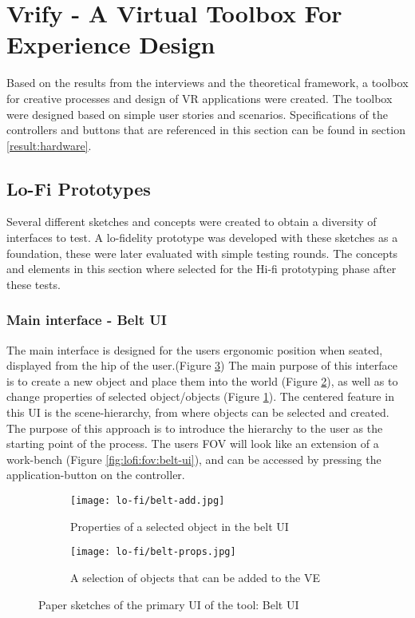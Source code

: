\section{Vrify - A Virtual Toolbox For Experience Design}
Based on the results from the interviews and the theoretical framework, a toolbox for creative processes and design of VR applications were created. The toolbox were designed based on simple user stories and scenarios. Specifications of the controllers and buttons that are referenced in this section can be found in section \ref{result:hardware}.

\subsection{Lo-Fi Prototypes}
 Several different sketches and concepts were created to obtain a diversity of interfaces to test. A lo-fidelity prototype was developed with these sketches as a foundation, these were later evaluated with simple testing rounds. The concepts and elements in this section where selected for the Hi-fi prototyping phase after these tests.

\subsubsection{Main interface - Belt UI}
The main interface is designed for the users ergonomic position when seated, displayed from the hip of the user.(Figure \ref{fig:lofi:belt-ui}) The main purpose of this interface is to create a new object and place them into the world (Figure \ref{fig:lofi:belt-ui:add}), as well as to change properties of selected object/objects (Figure \ref{fig:lofi:belt-ui:props}). The centered feature in this UI is the scene-hierarchy, from where objects can be selected and created. The purpose of this approach is to introduce the hierarchy to the user as the starting point of the process. The users FOV will look like an extension of a work-bench (Figure \ref{fig:lofi:fov:belt-ui}), and can be accessed by pressing the application-button on the controller.

\begin{figure}
\begin{subfigure}{.5\textwidth}
  \centering
  \texttt{[image: lo-fi/belt-add.jpg]}
  \caption{Properties of a selected object in the belt UI}
  \label{fig:lofi:belt-ui:props}
\end{subfigure}%
\begin{subfigure}{.5\textwidth}
  \centering
  \texttt{[image: lo-fi/belt-props.jpg]}
  \caption{A selection of objects that can be added to the VE}
  \label{fig:lofi:belt-ui:add}
\end{subfigure}
\caption{Paper sketches of the primary UI of the tool: Belt UI}
\label{fig:lofi:belt-ui}
\end{figure}

